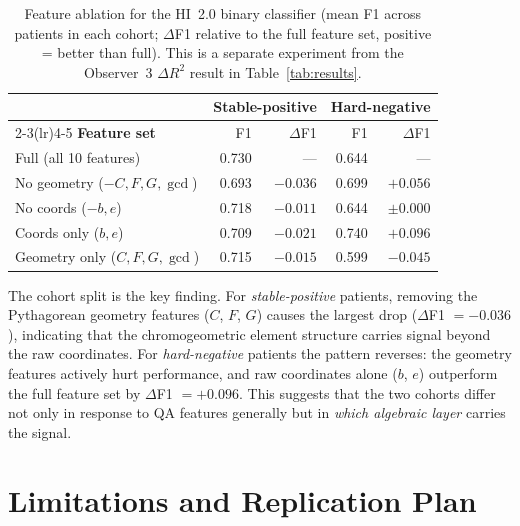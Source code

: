 \documentclass[11pt]{article}
\begin{document}
\begin{table}[h]
\centering
\small
\begin{tabular}{lrrrr}
\toprule
& \multicolumn{2}{c}{\textbf{Stable-positive}} & \multicolumn{2}{c}{\textbf{Hard-negative}} \\
\cmidrule(lr){2-3}\cmidrule(lr){4-5}
\textbf{Feature set} & F1 & $\Delta$F1 & F1 & $\Delta$F1 \\
\midrule
Full (all 10 features)          & 0.730 & ---    & 0.644 & --- \\
No geometry ($-C,F,G,\gcd$)     & 0.693 & $-0.036$ & 0.699 & $+0.056$ \\
No coords ($-b,e$)              & 0.718 & $-0.011$ & 0.644 & $\pm 0.000$ \\
Coords only ($b,e$)             & 0.709 & $-0.021$ & 0.740 & $+0.096$ \\
Geometry only ($C,F,G,\gcd$)    & 0.715 & $-0.015$ & 0.599 & $-0.045$ \\
\bottomrule
\end{tabular}
\caption{Feature ablation for the HI~2.0 binary classifier (mean F1 across patients
in each cohort; $\Delta$F1 relative to the full feature set, positive = better than full).
This is a separate experiment from the Observer~3 $\Delta R^2$ result in Table~\ref{tab:results}.}
\label{tab:ablation}
\end{table}

The cohort split is the key finding.
For \emph{stable-positive} patients, removing the Pythagorean geometry features ($C$, $F$, $G$)
causes the largest drop ($\Delta$F1 $= -0.036$), indicating that the chromogeometric
element structure carries signal beyond the raw coordinates.
For \emph{hard-negative} patients the pattern reverses: the geometry features actively
hurt performance, and raw coordinates alone ($b$, $e$) outperform the full feature set
by $\Delta$F1 $= +0.096$.
This suggests that the two cohorts differ not only in response to QA features generally
but in \emph{which algebraic layer} carries the signal.

\section{Limitations and Replication Plan}\label{sec:limits}
\end{document}
